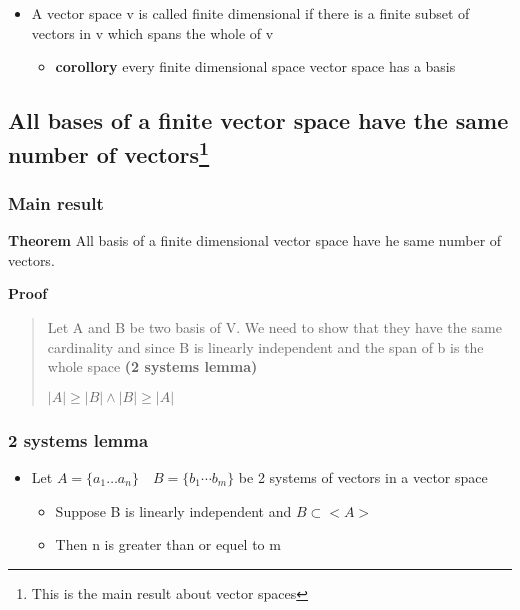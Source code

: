 \documentclass[twocolumn]{article}
\providecommand{\tightlist}{%
  \setlength{\itemsep}{0pt}\setlength{\parskip}{0pt}}
\begin{document}
\begin{itemize}
\tightlist
\item
  A vector space v is called finite dimensional if there is a finite
  subset of vectors in v which spans the whole of v

  \begin{itemize}
  \tightlist
  \item
    \textbf{corollory} every finite dimensional space vector space has a
    basis
  \end{itemize}
\end{itemize}

\hypertarget{all-bases-of-a-finite-vector-space-have-the-same-number-of-vectors}{%
\subsection[All bases of a finite vector space have the same number of
vectors]{\texorpdfstring{All bases of a finite vector space have the
same number of vectors\footnote{This is the main result about vector
  spaces}}{All bases of a finite vector space have the same number of vectors}}\label{all-bases-of-a-finite-vector-space-have-the-same-number-of-vectors}}

\hypertarget{main-result}{%
\subsubsection{Main result}\label{main-result}}

\textbf{Theorem} All basis of a finite dimensional vector space have he
same number of vectors.

\textbf{Proof}

\begin{quote}
Let A and B be two basis of V. We need to show that they have the same
cardinality and since B is linearly independent and the span of b is the
whole space \textbf{(2 systems lemma)}

\(|A| \geq |B| \wedge |B| \geq |A|\)
\end{quote}

\hypertarget{systems-lemma}{%
\subsubsection{2 systems lemma}\label{systems-lemma}}

\begin{itemize}
\tightlist
\item
  Let \(A = \{a_1 \dots a_n\} \quad B = \{b_1 \cdots b_m\}\) be 2
  systems of vectors in a vector space

  \begin{itemize}
  \tightlist
  \item
    Suppose B is linearly independent and \(B \subset <A>\)
  \item
    Then n is greater than or equel to m
  \end{itemize}
\end{itemize}
\end{document}
